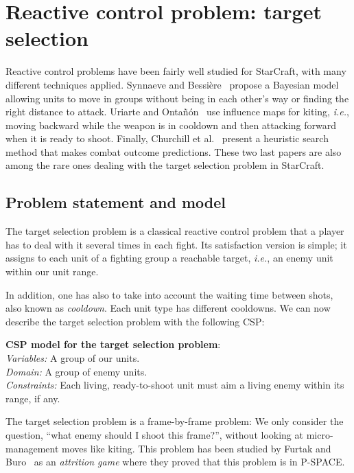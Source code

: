 \documentclass[journal]{IEEEtran}
\newcommand{\csp}{\textsc{CSP}\xspace}
\newcommand{\ie}{\textit{i.e.}}
\newcommand{\modelcsp}[4]%
{ \begin{trivlist}
  \item[]%
    \textbf{CSP model for #1}:\\
    \textit{Variables:} #2\\
    \textit{Domain:} #3\\
    \textit{Constraints:} #4
  \end{trivlist}%
}
\begin{document}
\section{Reactive control problem: target selection}\label{sec:target}

Reactive control problems have been fairly well studied for StarCraft,
with  many different  techniques  applied. Synnaeve  and
Bessi{\`e}re~\cite{SynnaeveB11-b}  propose a   Bayesian  model
allowing units  to move in  groups without  being in each  other's way or
finding the right distance to attack. Uriarte and Onta{\~n}{\'o}n~\cite{UriarteO12}
use influence  maps  for  kiting, \ie,  moving
backward while the weapon is in cooldown and then attacking  forward when it is ready to
shoot.  Finally, Churchill  et  al.~\cite{ChurchillSB12,  ChurchillB12}
present a heuristic search  method that makes combat outcome predictions.
These two  last papers are also  among the rare ones  dealing with the
target selection problem in StarCraft.

\subsection{Problem statement and model}

The target selection problem is  a classical reactive control problem that
a  player has  to  deal with  it  several times  in  each fight.   Its
satisfaction version  is simple; it assigns  to each
unit of a fighting group a reachable target, \ie, an enemy unit within
our unit range.

In addition, one has also to take  into account the waiting time between shots, also known as \emph{cooldown}.
Each unit type has different cooldowns.  We  can now  describe the  target selection
problem with the following \csp:
\modelcsp{the target selection problem}%
{A group of our units.}%
{A group of enemy units.}%
{Each living, ready-to-shoot  unit must aim a living  enemy within its
  range, if any.}

The  target selection  problem is  a frame-by-frame  problem: We  only
consider  the question,  ``what  enemy should  I  shoot this  frame?'',
without looking at micro-management moves like kiting. This problem has been studied by Furtak and Buro~\cite{Furtak2010} as an {\em attrition game} where they proved that this problem is in P-SPACE.
\end{document}
